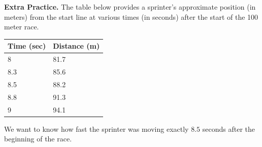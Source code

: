 \documentclass[10pt]{article}
\begin{document}
\newpage
{\bf\color{blue} Extra Practice.} \reversemarginpar{} The table below provides a sprinter's approximate position (in meters) from the start line at various times (in seconds) after the start of the 100 meter race.

\begin{center}
    \begin{tabular}{| l | l |}
    \hline
    Time (sec) & Distance (m)\\
    \hline
    8 & 81.7\\
    \hline
    8.3 & 85.6\\
    \hline
    8.5 & 88.2\\
    \hline
    8.8 & 91.3\\
    \hline
    9 & 94.1\\
    \hline
    \end{tabular}
\end{center}

We want to know how fast the sprinter was moving exactly $8.5$ seconds after the beginning of the race. 
\end{document}
